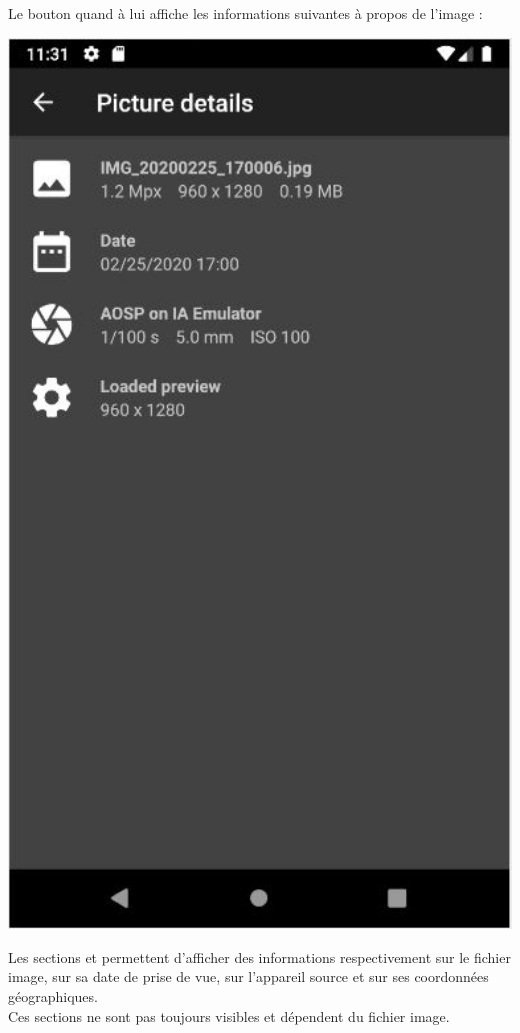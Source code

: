 Le bouton {\faInfoCircle} quand à lui affiche les informations suivantes à propos de l'image :
\begin{center}
    \begin{minipage}{.48\textwidth}
      \includegraphics[width=1\textwidth]{report_src/app_manual/info_fragment_preview.JPG}
    \end{minipage}
    \begin{minipage}{.48\textwidth}
        Les sections {\faPhoto} {\faCalendar} {\faChrome} et {\faMapMarker} permettent d'afficher des informations respectivement sur le fichier image, sur sa date de prise de vue, sur l'appareil source et sur ses coordonnées géographiques.
        \\
        Ces sections ne sont pas toujours visibles et dépendent du fichier image.
        \\


\end{minipage}
\end{center}

